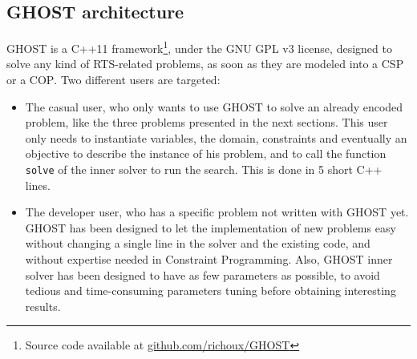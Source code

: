 \documentclass[journal]{IEEEtran}
\newcommand{\csp}{\textsc{CSP}\xspace}
\newcommand{\cop}{\textsc{COP}\xspace}
\newcommand{\ghost}{\textsc{GHOST}\xspace}
\begin{document}
\subsection{\ghost architecture}

\ghost  is a  C++11 framework\footnote{Source  code available  at
  \href{https://github.com/richoux/GHOST}{github.com/richoux/GHOST}},
under  the  GNU  GPL  v3  license,  designed  to  solve  any  kind  of
RTS-related problems,  as soon as  they are modeled  into a \csp  or a
\cop. Two different users are targeted:
\begin{itemize}
\item  The casual  user, who  only  wants to  use \ghost  to solve  an
  already encoded problem,  like the three problems  presented in the next
  sections.   This  user  only  needs to  instantiate  variables,  the
  domain,  constraints and  eventually  an objective  to describe  the
  instance of his problem, and  to call the function \texttt{solve} of
  the inner solver to run the search. This is done in 5 short C++ lines.
\item The developer user, who has  a specific problem not written with
  \ghost yet.  \ghost  has been designed to let  the implementation of
  new problems easy  without changing a single line in  the solver and
  the  existing  code,  and  without expertise  needed  in  Constraint
  Programming.   Also, \ghost inner  solver has  been designed  to have  as few
  parameters  as   possible,  to  avoid  tedious   and  time-consuming
  parameters tuning before obtaining interesting results.
\end{itemize}
\end{document}
